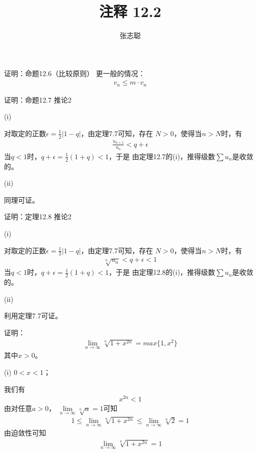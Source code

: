 \documentclass{article}
\begin{document}
\title{注释 12.2}
\author{张志聪}
\maketitle

\begin{zremark}
  证明：命题12.6（比较原则） 更一般的情况：
  \begin{align*}
    v_n \leq m \cdot v_n
  \end{align*}
\end{zremark}


\begin{zremark}
  证明：命题12.7 推论2
\end{zremark}

(i)

对取定的正数$\epsilon = \frac{1}{2}|1 - q|$，由定理7.7可知，存在
$N > 0$，使得当$n > N$时，有
\begin{align*}
  \frac{u_{n + 1}}{u_n} < q + \epsilon
\end{align*}
当$q < 1$时，$q + \epsilon = \frac{1}{2} (1 + q) < 1$，于是
由定理12.7的(i)，推得级数$\sum u_n$是收敛的。

(ii)

同理可证。

\begin{zremark}
  证明：定理12.8 推论2
\end{zremark}

(i) 

对取定的正数$\epsilon = \frac{1}{2}|1 - q|$，由定理7.7可知，存在
$N > 0$，使得当$n > N$时，有
\begin{align*}
  \sqrt[n]{u_n} < q + \epsilon < 1
\end{align*}
当$q < 1$时，$q + \epsilon = \frac{1}{2} (1 + q) < 1$，于是
由定理12.8的(i)，推得级数$\sum u_n$是收敛的。

(ii)

利用定理7.7可证。

\begin{zremark}
  证明：
  \begin{align*}
    \lim\limits_{n \to \infty} \sqrt[n]{1 + x^{2n}} = max\{1, x^2\}
  \end{align*}
  其中$x > 0$。
\end{zremark}

(i) $0 < x < 1$；

我们有
\begin{align*}
  x^{2n} < 1
\end{align*}
由对任意$a > 0$， $\lim\limits_{n \to \infty} \sqrt[n]{a} = 1$可知
\begin{align*}
  1 \leq \lim\limits_{n \to \infty} \sqrt[n]{1 + x^{2n}} \leq \lim\limits_{n \to \infty} \sqrt[n]{2} = 1
\end{align*}
由迫敛性可知
\begin{align*}
  \lim\limits_{n \to \infty} \sqrt[n]{1 + x^{2n}} = 1
\end{align*}
\end{document}
